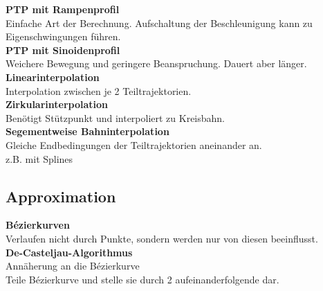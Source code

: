 \textbf{PTP mit Rampenprofil}\\
Einfache Art der Berechnung. Aufschaltung der Beschleunigung kann zu Eigenschwingungen führen.\\

\textbf{PTP mit Sinoidenprofil}\\
Weichere Bewegung und geringere Beanspruchung. Dauert aber länger.\\

\textbf{Linearinterpolation}\\
Interpolation zwischen je 2 Teiltrajektorien.\\

\textbf{Zirkularinterpolation}\\
Benötigt Stützpunkt und interpoliert zu Kreisbahn.\\

\textbf{Segementweise Bahninterpolation}\\
Gleiche Endbedingungen der Teiltrajektorien aneinander an.\\
z.B. mit Splines


\subsection{Approximation}
\textbf{Bézierkurven}\\
Verlaufen nicht durch Punkte, sondern werden nur von diesen beeinflusst.\\

\textbf{De-Casteljau-Algorithmus}\\
Annäherung an die Bézierkurve\\
Teile Bézierkurve und stelle sie durch 2 aufeinanderfolgende dar.